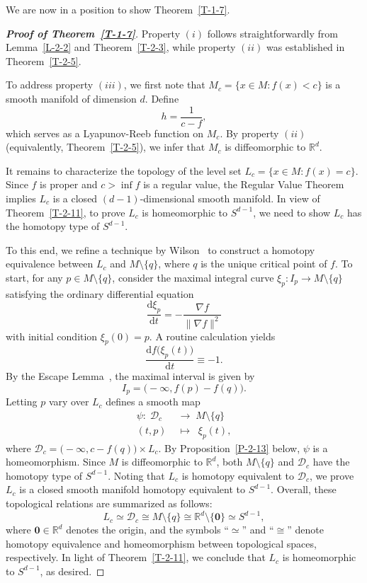 \documentclass[11pt,letterpaper]{amsart}
\theoremstyle{plain}
\theoremstyle{definition}
\theoremstyle{remark}
\numberwithin{equation}{section}
\begin{document}
We are now in a position to show Theorem~\ref{T-1-7}.
\begin{proof}[\textbf{Proof of Theorem~\ref{T-1-7}}]
Property $(i)$ follows straightforwardly from Lemma~\ref{L-2-2} and Theorem~\ref{T-2-3}, while property $(ii)$ was established in Theorem~\ref{T-2-5}.

To address property $(iii)$, we first note that $M_c=\big\{x\in M: f(x)<c\big\}$ is a smooth manifold of dimension $d$. Define
\[
h=\frac{1}{c-f},
\]
which serves as a Lyapunov-Reeb function on $M_c$. By property $(ii)$ (equivalently, Theorem~\ref{T-2-5}), we infer that $M_c$ is diffeomorphic to $\mathbb{R}^d$.

It remains to characterize the topology of the level set
$L_c=\big\{x\in M: f(x)=c\big\}$.  Since $f$ is proper and $c>\inf f$ is a regular value, the Regular Value Theorem~\cite[Corollary 5.14]{Lee-2018} implies $L_c$ is a closed $(d-1)$-dimensional smooth manifold. In view of Theorem~\ref{T-2-11}, to prove $L_c$
is homeomorphic to $S^{d-1}$, we need to show $L_c$ has the homotopy type of $S^{d-1}$.

To this end, we refine a technique by Wilson~\cite{Wilson-1967} to construct a homotopy equivalence between $L_c$ and $M\setminus\{q\}$, where $q$ is the unique critical point of $f$. To start, for any $p\in M\setminus\{q\}$, consider the maximal integral curve $\xi_p:I_p\to M\setminus\{q\}$
satisfying the ordinary differential equation
\[
\frac{\mathrm d \xi_p}{ \mathrm d t} = -\frac{\nabla f}{\|\nabla f\|^2}
\]
with initial condition $\xi_p(0)=p$. A routine calculation yields
\[
\frac{\mathrm d f\big(\xi_{p}(t)\big)}{\mathrm d t}\equiv-1.
\]
By the Escape Lemma~\cite[Lemma 9.19]{Lee-2018}, the maximal interval is given by
\[
I_p=\big(-\infty,f(p)-f(q)\big).
\]
Letting $p$ vary over $L_c$ defines a smooth map
\[
\begin{aligned}
\psi:\; \mathcal D_c\;\,&\longrightarrow\; M\setminus\{q\}\\
          (t,p)\;&\longmapsto\;\; \xi_p(t),
\end{aligned}
\]
where $\mathcal D_c=\big(-\infty,c-f(q)\big)\times L_c$. By Proposition~\ref{P-2-13} below,  $\psi$ is a homeomorphism. Since $M$ is diffeomorphic to $\mathbb{R}^d$,  both $M\setminus\{q\}$ and $\mathcal D_c$ have the homotopy type of $S^{d-1}$. Noting that $L_c$ is homotopy equivalent to $\mathcal D_c$, we prove $L_c$ is a closed smooth manifold homotopy equivalent to $S^{d-1}$. Overall, these topological relations are summarized as follows:
\[
L_c\simeq \mathcal D_c\cong M\setminus\{q\}\cong\mathbb R^d\setminus\{\mathbf{0}\}\simeq S^{d-1},
\]
where $\mathbf{0}\in \mathbb R^d$ denotes the origin, and the symbols ``$\simeq$'' and ``$\cong$'' denote homotopy equivalence and homeomorphism between topological spaces, respectively. In light of Theorem~\ref{T-2-11}, we conclude that $L_c$ is homeomorphic to $S^{d-1}$, as desired.
\end{proof}
\end{document}
